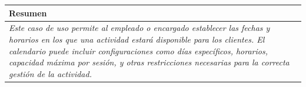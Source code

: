     \begin{table}[H]
        \begin{tabular}{llllllll}
    \hline
    \multicolumn{8}{|l|}{\cellcolor[HTML]{F2F2F2}Resumen}                                                                                                                                                                                                                                                                                                                                                                                             \\ \hline
    \multicolumn{8}{|p{15cm}|}{{\color[HTML]{808080} \textit{Este caso de uso permite al empleado o encargado establecer las fechas y horarios en los que una actividad estará disponible para los clientes. El calendario puede incluir configuraciones como días específicos, horarios, capacidad máxima por sesión, y otras restricciones necesarias para la correcta gestión de la actividad.}}} \\ \hline
    \end{tabular}
    \end{table}

